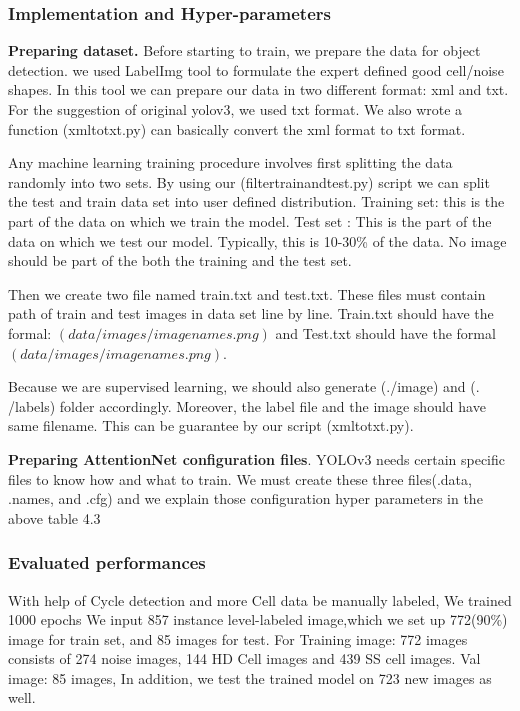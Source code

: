 \subsubsection{Implementation and Hyper-parameters}

\textbf{Preparing dataset.} Before starting to train, we prepare the data for object detection. we used LabelImg tool to formulate the expert defined good cell/noise shapes. In this tool we can prepare our data in two different format: xml and txt. For the suggestion of original yolov3, we used txt format. We also wrote a function (xmltotxt.py) can basically convert the xml format to txt format. 

Any machine learning training procedure involves first splitting the data randomly into two sets. By using our (filtertrainandtest.py) script we can split the test and train data set into user defined distribution. Training set: this is the part of the data on which we train the model. Test set : This is the part of the data on which we test our model. Typically, this is 10-30\% of the data. No image should be part of the both the training and the test set.

Then we create two file named train.txt and test.txt. These files must contain path of train and test images in data set line by line. Train.txt should have the formal: $(data/images/imagenames.png)$ and Test.txt should have the formal $(data/images/imagenames.png)$.

Because we are supervised learning, we should also generate (./image) and (. /labels) folder accordingly. Moreover, the label file and the image should have same filename. This can be guarantee by our script (xmltotxt.py).

\textbf{Preparing AttentionNet configuration files}. YOLOv3 needs certain specific files to know how and what to train. We must create these three files(.data, .names, and .cfg) and we explain those configuration hyper parameters in the above table 4.3\\



\subsubsection{Evaluated performances}
With help of Cycle detection and more Cell data be manually labeled, We trained 1000 epochs We input 857 instance level-labeled image,which we set up 772(90\%) image for train set, and 85 images for test. For Training image: 772 images consists of 274 noise images, 144 HD Cell images and 439 SS cell images. Val image: 85 images, In addition, we test the trained model on 723 new images as well.


